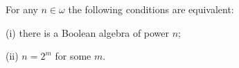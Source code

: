 For any $n \in \omega$ the following conditions are equivalent:

(i) there is a Boolean algebra of power $n$;

(ii) $n = 2^m$ for some $m$.

